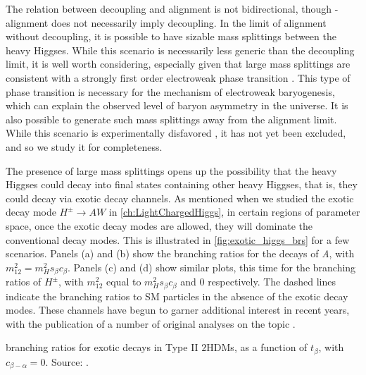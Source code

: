 The relation between decoupling and alignment is not bidirectional, though - alignment does not necessarily imply decoupling. In the limit of alignment without decoupling, it is possible to have sizable mass splittings between the heavy Higgses. While this scenario is necessarily less generic than the decoupling limit, it is well worth considering, especially given that large mass splittings are consistent with a strongly first order electroweak phase transition \cite{Dorsch:2014qja}. This type of phase transition is necessary for the mechanism of electroweak baryogenesis, which can explain the observed level of baryon asymmetry in the universe. It is also possible to generate such mass splittings away from the alignment limit. While this scenario is experimentally disfavored \cite{Aad:2015pla}, it has not yet been excluded, and so we study it for completeness.

The presence of large mass splittings opens up the possibility that the heavy Higgses could decay into final states containing other heavy Higgses, that is, they could decay via exotic decay channels. As mentioned when we studied the exotic decay mode $H^\pm \rightarrow AW$ in \autoref{ch:LightChargedHiggs}, in certain regions of parameter space, once the exotic decay modes are allowed, they will dominate the conventional decay modes. This is illustrated in \autoref{fig:exotic_higgs_brs} for a few scenarios. Panels (a) and (b) show the branching ratios for the decays of \emph{A}, with $m_{12}^2 = m_H^2 s_\beta c_\beta$. Panels (c) and (d) show similar plots, this time for the branching ratios of $H^\pm$, with $m_{12}^2$ equal to $m_H^2 s_\beta c_\beta$ and $0$ respectively. The dashed lines indicate the branching ratios to SM particles in the absence of the exotic decay modes. These channels have begun to garner additional interest in recent years, with the publication of a number of original analyses on the topic \cite{Dorsch:2014qja,Dorsch:2016tab,Coleppa:2013xfa,Coleppa:2014hxa,Brownson:2013lka,Coleppa:2014cca,Kling:2015uba,Li:2015lra,Maitra:2014qea,Basso:2012st,Dermisek:2013cxa,Mohn:2005lda,Assamagan:2000ud}. 

\begin{marginfigure}[1cm]
  \centering
  \caption{branching ratios for exotic decays in Type II $2$HDMs, as a function of $t_\beta$, with $c_{\beta-\alpha} = 0$. Source: \cite{Kling:2016opi}.}
\label{fig:exotic_higgs_brs}
\end{marginfigure}


